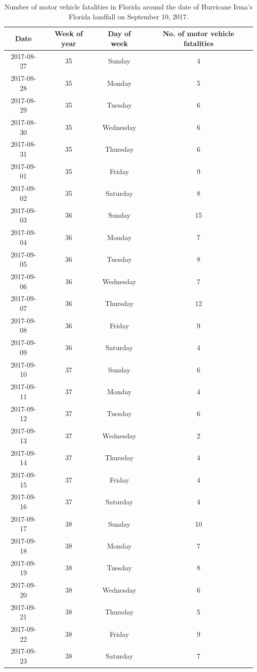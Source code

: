 \documentclass[]{tufte-book}
\begin{document}
\begin{table}[t]

\caption{\label{tab:exampledata}Number of motor vehicle fatalities in Florida around the date of Hurricane Irma's Florida landfall on September 10, 2017.}
\centering
\begin{tabular}{c|c|c|c}
\hline
Date & Week of year & Day of week & No. of motor vehicle fatalities\\
\hline
2017-08-27 & 35 & Sunday & 4\\
\hline
2017-08-28 & 35 & Monday & 5\\
\hline
2017-08-29 & 35 & Tuesday & 6\\
\hline
2017-08-30 & 35 & Wednesday & 6\\
\hline
2017-08-31 & 35 & Thursday & 6\\
\hline
2017-09-01 & 35 & Friday & 9\\
\hline
2017-09-02 & 35 & Saturday & 8\\
\hline
2017-09-03 & 36 & Sunday & 15\\
\hline
2017-09-04 & 36 & Monday & 7\\
\hline
2017-09-05 & 36 & Tuesday & 8\\
\hline
2017-09-06 & 36 & Wednesday & 7\\
\hline
2017-09-07 & 36 & Thursday & 12\\
\hline
2017-09-08 & 36 & Friday & 9\\
\hline
2017-09-09 & 36 & Saturday & 4\\
\hline
2017-09-10 & 37 & Sunday & 6\\
\hline
2017-09-11 & 37 & Monday & 4\\
\hline
2017-09-12 & 37 & Tuesday & 6\\
\hline
2017-09-13 & 37 & Wednesday & 2\\
\hline
2017-09-14 & 37 & Thursday & 4\\
\hline
2017-09-15 & 37 & Friday & 4\\
\hline
2017-09-16 & 37 & Saturday & 4\\
\hline
2017-09-17 & 38 & Sunday & 10\\
\hline
2017-09-18 & 38 & Monday & 7\\
\hline
2017-09-19 & 38 & Tuesday & 8\\
\hline
2017-09-20 & 38 & Wednesday & 6\\
\hline
2017-09-21 & 38 & Thursday & 5\\
\hline
2017-09-22 & 38 & Friday & 9\\
\hline
2017-09-23 & 38 & Saturday & 7\\
\hline
\end{tabular}
\end{table}
\end{document}
